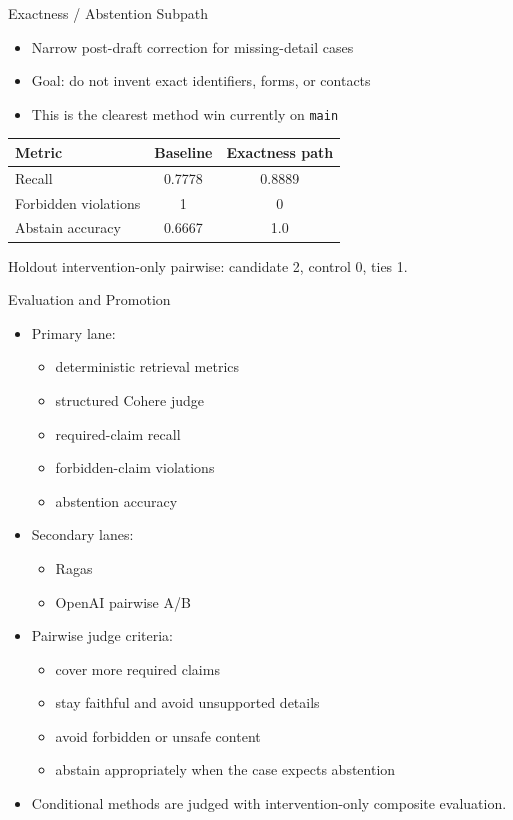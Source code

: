 \documentclass[aspectratio=169]{beamer}
\begin{document}
\begin{frame}{Exactness / Abstention Subpath}
  \begin{itemize}
    \item Narrow post-draft correction for missing-detail cases
    \item Goal: do not invent exact identifiers, forms, or contacts
    \item This is the clearest method win currently on \texttt{main}
  \end{itemize}

  \vspace{0.5em}
  \centering
  \begin{tabular}{lcc}
    \toprule
    Metric & Baseline & Exactness path \\
    \midrule
    Recall & 0.7778 & 0.8889 \\
    Forbidden violations & 1 & 0 \\
    Abstain accuracy & 0.6667 & 1.0 \\
    \bottomrule
  \end{tabular}

  \vspace{0.5em}
  Holdout intervention-only pairwise: candidate 2, control 0, ties 1.
\end{frame}

\begin{frame}{Evaluation and Promotion}
  \begin{itemize}
    \item Primary lane:
      \begin{itemize}
        \item deterministic retrieval metrics
        \item structured Cohere judge
        \item required-claim recall
        \item forbidden-claim violations
        \item abstention accuracy
      \end{itemize}
    \item Secondary lanes:
      \begin{itemize}
        \item Ragas
        \item OpenAI pairwise A/B
      \end{itemize}
    \item Pairwise judge criteria:
      \begin{itemize}
        \item cover more required claims
        \item stay faithful and avoid unsupported details
        \item avoid forbidden or unsafe content
        \item abstain appropriately when the case expects abstention
      \end{itemize}
    \item Conditional methods are judged with intervention-only composite evaluation.
  \end{itemize}
\end{frame}
\end{document}

